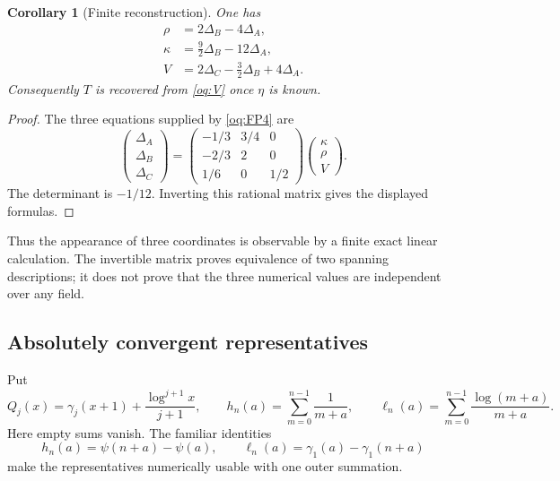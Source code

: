 \documentclass[11pt,a4paper]{article}
\numberwithin{equation}{section}
\newtheorem{corollary}[theorem]{Corollary}
\theoremstyle{definition}
\theoremstyle{remark}
\begin{document}
\begin{corollary}[Finite reconstruction]\label{oq:reconstruction}
One has
\begin{align}
 \rho&=2\Delta_B-4\Delta_A,\label{oq:recoverrho}\\
 \kappa&=\frac92\Delta_B-12\Delta_A,\label{oq:recoverkappa}\\
 V&=2\Delta_C-\frac32\Delta_B+4\Delta_A.\label{oq:recoverV}
\end{align}
Consequently $T$ is recovered from \eqref{oq:V} once $\eta$ is known.
\end{corollary}
\begin{proof}
The three equations supplied by \eqref{oq:FP4} are
\[
 \begin{pmatrix}\Delta_A\\\Delta_B\\\Delta_C\end{pmatrix}
 =\begin{pmatrix}-1/3&3/4&0\\-2/3&2&0\\1/6&0&1/2\end{pmatrix}
 \begin{pmatrix}\kappa\\\rho\\V\end{pmatrix}.
\]
The determinant is $-1/12$. Inverting this rational matrix gives the
displayed formulas.
\end{proof}

Thus the appearance of three coordinates is observable by a finite exact
linear calculation. The invertible matrix proves equivalence of two
spanning descriptions; it does not prove that the three numerical values
are independent over any field.

\subsection{Absolutely convergent representatives}

Put
\[
 Q_j(x)=\gamma_j(x+1)+\frac{\log^{j+1}x}{j+1},\qquad
 h_n(a)=\sum_{m=0}^{n-1}\frac1{m+a},\qquad
 \ell_n(a)=\sum_{m=0}^{n-1}\frac{\log(m+a)}{m+a}.
\]
Here empty sums vanish. The familiar identities
\[
 h_n(a)=\psi(n+a)-\psi(a),\qquad
 \ell_n(a)=\gamma_1(a)-\gamma_1(n+a)
\]
make the representatives numerically usable with one outer summation.
\end{document}
